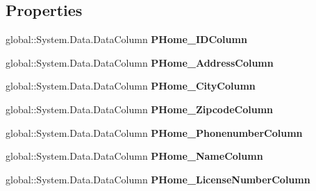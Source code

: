 \subsection*{Properties}
\begin{DoxyCompactItemize}
\item 
\mbox{\label{class_a_f_h___scheduler_1_1_home_inspection_data_set_1_1_provider___homes_data_table_a465ea02d7f5ae4d3504d68ee25212c03}} 
global\+::\+System.\+Data.\+Data\+Column {\bfseries P\+Home\+\_\+\+I\+D\+Column}\hspace{0.3cm}{\ttfamily  [get]}
\item 
\mbox{\label{class_a_f_h___scheduler_1_1_home_inspection_data_set_1_1_provider___homes_data_table_aab6101b5cd880fca67133c2411fbb2f3}} 
global\+::\+System.\+Data.\+Data\+Column {\bfseries P\+Home\+\_\+\+Address\+Column}\hspace{0.3cm}{\ttfamily  [get]}
\item 
\mbox{\label{class_a_f_h___scheduler_1_1_home_inspection_data_set_1_1_provider___homes_data_table_a22508c186c39be57be84645d73179b10}} 
global\+::\+System.\+Data.\+Data\+Column {\bfseries P\+Home\+\_\+\+City\+Column}\hspace{0.3cm}{\ttfamily  [get]}
\item 
\mbox{\label{class_a_f_h___scheduler_1_1_home_inspection_data_set_1_1_provider___homes_data_table_a456235ef9f32e8d45d736bba3c314482}} 
global\+::\+System.\+Data.\+Data\+Column {\bfseries P\+Home\+\_\+\+Zipcode\+Column}\hspace{0.3cm}{\ttfamily  [get]}
\item 
\mbox{\label{class_a_f_h___scheduler_1_1_home_inspection_data_set_1_1_provider___homes_data_table_ae2c854bfa951668b9bef8d90ba92afdc}} 
global\+::\+System.\+Data.\+Data\+Column {\bfseries P\+Home\+\_\+\+Phonenumber\+Column}\hspace{0.3cm}{\ttfamily  [get]}
\item 
\mbox{\label{class_a_f_h___scheduler_1_1_home_inspection_data_set_1_1_provider___homes_data_table_ad51a9e4481082498016be7255e9b3135}} 
global\+::\+System.\+Data.\+Data\+Column {\bfseries P\+Home\+\_\+\+Name\+Column}\hspace{0.3cm}{\ttfamily  [get]}
\item 
\mbox{\label{class_a_f_h___scheduler_1_1_home_inspection_data_set_1_1_provider___homes_data_table_a0ea2be70843e5f7c1895f94738029e77}} 
global\+::\+System.\+Data.\+Data\+Column {\bfseries P\+Home\+\_\+\+License\+Number\+Column}\hspace{0.3cm}{\ttfamily  [get]}

\end{DoxyCompactItemize}
